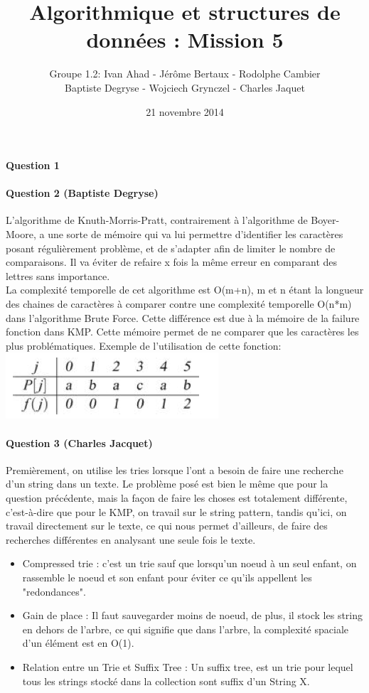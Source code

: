 \documentclass[a4paper]{article}
\title{Algorithmique et structures de données : Mission 5}
\date{21 novembre 2014}
\author{Groupe 1.2: Ivan Ahad - Jérôme Bertaux - Rodolphe Cambier \\ 
	Baptiste Degryse - Wojciech Grynczel - Charles Jaquet}
\begin{document}
\maketitle

\paragraph*{Question 1}
\paragraph*{Question 2 (Baptiste Degryse)}
L'algorithme de Knuth-Morris-Pratt, contrairement à l'algorithme de Boyer-Moore, a une sorte de mémoire qui va lui permettre d'identifier les caractères posant régulièrement problème, et de s'adapter afin de limiter le nombre de comparaisons. Il va éviter de refaire x fois la même erreur en comparant des lettres sans importance.\\

La complexité temporelle de cet algorithme est O(m+n), m et n étant la longueur des chaines de caractères à comparer contre une complexité temporelle O(n*m) dans l'algorithme Brute Force. Cette différence est due à la mémoire de la failure fonction dans  KMP. Cette mémoire permet de ne comparer que les caractères les plus problématiques. Exemple de l'utilisation de cette fonction:\\
\includegraphics[scale=1]{imgFailure.png}

\paragraph*{Question 3 (Charles Jacquet)} 

Premièrement, on utilise les tries lorsque l'ont a besoin de faire une recherche d'un string dans un texte. Le problème posé est bien le même que pour la question précédente, mais la façon de faire les choses est totalement différente, c'est-à-dire que pour le KMP, on travail sur le string pattern, tandis qu'ici, on travail directement sur le texte, ce qui nous permet d'ailleurs, de faire des recherches différentes en analysant une seule fois le texte.
\begin{itemize}
\item {Compressed trie} : c'est un trie sauf que lorsqu'un noeud à un seul enfant, on rassemble le noeud et son enfant pour éviter ce qu'ils appellent les "redondances".
\item {Gain de place} : Il faut sauvegarder moins de noeud, de plus, il stock les string en dehors de l'arbre, ce qui signifie que dans l'arbre, la complexité spaciale d'un élément est en O(1).
\item {Relation entre un Trie et Suffix Tree} : Un suffix tree, est un trie pour lequel tous les strings stocké dans la collection sont suffix d'un String X.
\end{itemize}
\newpage
\end{document}
